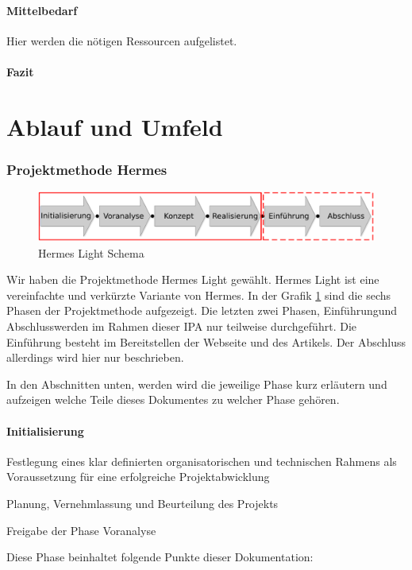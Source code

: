 \documentclass[11pt,paper=a4,final]{scrartcl}
\begin{document}
\subsection{Mittelbedarf}
Hier werden die n\"otigen Ressourcen aufgelistet.
\subsection{Fazit}
\part{Ablauf und Umfeld}
\section{Projektmethode Hermes}
\begin{figure}[htb!]
  \centering
  \includegraphics[width=\textwidth]{hermes.pdf}
  \caption{Hermes Light Schema}
  \label{fig:hermes_schema}
\end{figure}
Wir haben die Projektmethode Hermes Light gew\"ahlt. Hermes Light ist eine
vereinfachte und verkürzte Variante von Hermes. In der Grafik
\ref{fig:hermes_schema} sind die sechs Phasen der Projektmethode aufgezeigt. Die
letzten zwei Phasen, \glqq Einführung\grqq und \glqq Abschluss\grqq werden im
Rahmen dieser IPA nur teilweise durchgeführt. Die Einf\"uhrung besteht im
Bereitstellen der Webseite und des Artikels. Der Abschluss allerdings wird hier
nur beschrieben.

In den Abschnitten unten, werden wird die jeweilige Phase kurz erläutern und
aufzeigen welche Teile dieses Dokumentes zu welcher Phase gehören.
\subsection{Initialisierung}
\begin{itemize*}
  \item Festlegung eines klar definierten organisatorischen und technischen
  Rahmens als Voraussetzung für eine erfolgreiche Projektabwicklung
  \item Planung, Vernehmlassung und Beurteilung des Projekts
  \item Freigabe der Phase Voranalyse
\end{itemize*}
Diese Phase beinhaltet folgende Punkte dieser Dokumentation:
\begin{itemize*}
  \item 
\end{itemize*}
\end{document}
